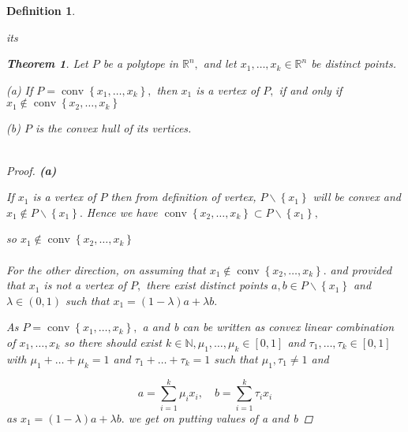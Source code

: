 \documentclass[oneside]{book}
\newtheorem{theorem}{Theorem}[section]
\newtheorem{mydef}{Definition}
\begin{document}
\begin{mydef} \label{d:7}

its










\begin{theorem}
\label{t:6}
Let $P$ be a polytope in $\mathbb{R}^{n},$ and let $x_{1}, \ldots, x_{k} \in \mathbb{R}^{n}$ be distinct points.\par
(a) If $P=\operatorname{conv}\left\{x_{1}, \ldots, x_{k}\right\},$ then $x_{1}$ is a vertex of $P,$ if and only if $x_{1} \notin \operatorname{conv}\left\{x_{2}, \ldots, x_{k}\right\}$ \par
(b) $P$ is the convex hull of its vertices. \\\\

\begin{proof}

\textbf{(a)}  \par 


 If  $x_{1}$ is a vertex of $P $ then  from definition of vertex, $P \backslash\left\{x_{1}\right\}$ will be convex and $x_{1} \notin P \backslash\left\{x_{1}\right\} .$ Hence we have  $\operatorname{conv}\left\{x_{2}, \ldots, x_{k}\right\} \subset P \backslash\left\{x_{1}\right\},$ 
 \par 
 so  $x_{1} \notin \operatorname{conv}\left\{x_{2}, \ldots, x_{k}\right\}$ \\\\
For the other direction, on assuming that $x_{1} \notin \operatorname{conv}\left\{x_{2}, \ldots, x_{k}\right\} .$ and provided that  $x_{1}$ is not a vertex of $P,$ there exist distinct points $a, b \in P \backslash\left\{x_{1}\right\}$ and $\lambda \in(0,1)$ such that $x_{1}=(1-\lambda) a+\lambda b .$ 

As  $P=\operatorname{conv}\left\{x_{1}, \ldots, x_{k}\right\},$ a and b can be written as convex linear combination of $x_{1},\ldots ,x_{k} $   so there should exist $k \in \mathbb{N}, \mu_{1}, \ldots, \mu_{k} \in[0,1]$ and $\tau_{1}, \ldots, \tau_{k} \in[0,1]$ with $\mu_{1}+\ldots+\mu_{k}=1$ and $\tau_{1}+\ldots+\tau_{k}=1$
such that $\mu_{1}, \tau_{1} \neq 1$ and \par
\begin{equation}
\label{eq37}
a=\sum_{i=1}^{k} \mu_{i} x_{i}, \quad b=\sum_{i=1}^{k} \tau_{i} x_{i}
\end{equation}  
as $x_{1}=(1-\lambda) a+\lambda b .$ we get on putting values of a and b 


\end{proof}
\end{theorem}
\end{mydef}
\end{document}
